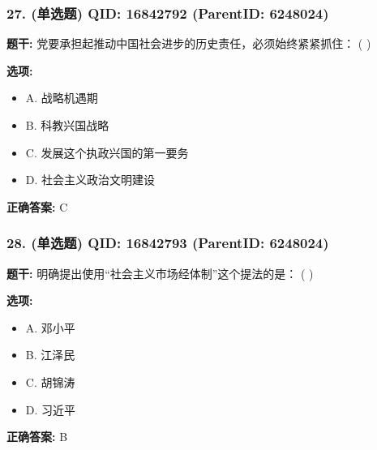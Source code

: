 \documentclass[12pt,UTF8]{ctexart}
\begin{document}
\vspace{0.3em}\hrulefill\vspace{0.7em}

\subsubsection*{27. (单选题) \small QID: 16842792 (ParentID: 6248024)}

\textbf{题干:}
党要承担起推动中国社会进步的历史责任，必须始终紧紧抓住： ( )



\textbf{选项:}
\begin{itemize}[leftmargin=*]

  \item A. 战略机遇期

  \item B. 科教兴国战略

  \item C. 发展这个执政兴国的第一要务

  \item D. 社会主义政治文明建设

\end{itemize}

\textbf{正确答案:}
C

\vspace{0.3em}\hrulefill\vspace{0.7em}

\subsubsection*{28. (单选题) \small QID: 16842793 (ParentID: 6248024)}

\textbf{题干:}
明确提出使用“社会主义市场经体制”这个提法的是：  ( )



\textbf{选项:}
\begin{itemize}[leftmargin=*]

  \item A. 邓小平

  \item B. 江泽民

  \item C. 胡锦涛

  \item D. 习近平

\end{itemize}

\textbf{正确答案:}
B

\vspace{0.3em}\hrulefill\vspace{0.7em}
\end{document}
